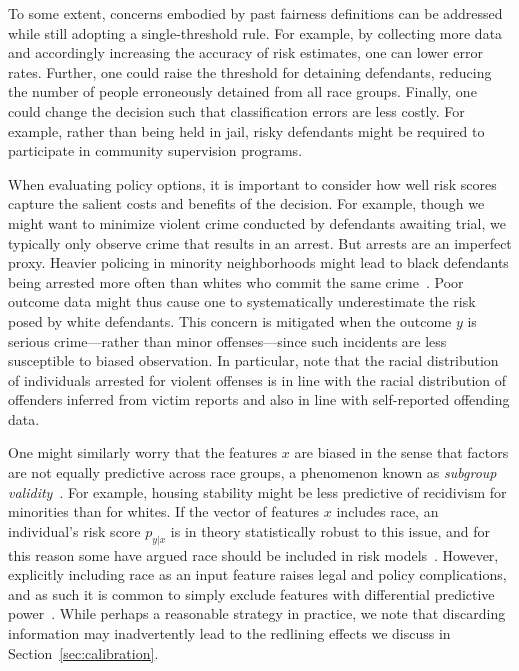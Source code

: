 \documentclass[sigconf]{acmart}
\begin{document}
To some extent, concerns embodied by past fairness definitions can be addressed while still adopting a single-threshold rule. For example, by collecting more data and accordingly increasing the accuracy of risk estimates, one can lower error rates. 
Further, one could raise the threshold for detaining defendants, reducing the number of people erroneously detained from all race groups. Finally, one could change the decision such that classification errors are less costly. For example, rather than being held in jail, risky defendants might be required to participate in community supervision programs.

When evaluating policy options, it is important to consider how well risk scores capture the salient costs and benefits of the decision. For example, though we might want to minimize violent crime conducted by defendants awaiting trial, we typically only observe crime that results in an arrest. But arrests are an imperfect proxy. Heavier policing in minority neighborhoods might lead to black defendants being arrested more often than whites who commit the same crime~\cite{lum2016predict}. Poor outcome data might thus cause one to systematically underestimate the risk posed by white defendants.
This concern is mitigated when the outcome $y$ is serious crime---rather than minor offenses---since such incidents are less susceptible to biased observation. In particular, \citet{skeem2015risk} note that the racial distribution of individuals arrested for violent offenses is in line with the racial distribution of offenders inferred from victim reports and also in line with self-reported offending data. 

One might similarly worry that the features $x$ are biased in the sense that factors are not equally predictive across race groups, a phenomenon known as \emph{subgroup validity}~\cite{ayres2002outcome}. For example, housing stability might be less predictive of recidivism for minorities than for whites. If the vector of features $x$ includes race, an individual's risk score $p_{y|x}$ is in theory statistically robust to this issue, and for this reason some have argued race should be included in risk models~\cite{berk_2009}. However, explicitly including race as an input feature raises legal and policy complications, and as such it is common to simply exclude features with differential predictive power~\cite{danner2015}. While perhaps a reasonable strategy in practice, we note that discarding information may inadvertently lead to the redlining effects we discuss in Section~\ref{sec:calibration}.
\end{document}
